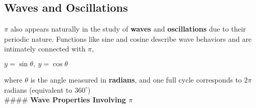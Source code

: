 \documentclass[12pt]{article}
\begin{document}
\subsection{Waves and Oscillations}

$\pi$ also appears naturally in the study of \textbf{waves} and \textbf{oscillations} due to their periodic nature. Functions like sine and cosine describe wave behaviors and are intimately connected with $\pi$,
\begin{center}
    $y = \sin\theta, \ y = \cos\theta$
\end{center}
where $\theta$ is the angle measured in \textbf{radians}, and one full cycle corresponds to $2\pi$ radians (equivalent to $360^\circ$)\\

#### \textbf{Wave Properties Involving $\pi$}
\end{document}
